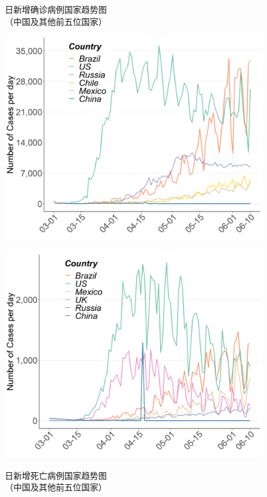 \documentclass[
]{article}
\begin{document}
\begin{figure}[H]
\centering
\begin{minipage}[b]{0.45\linewidth}
\caption{日新增确诊病例国家趋势图\\（中国及其他前五位国家）}
\includegraphics[]{./input/covid2.png}
\label{}
\end{minipage}
\quad
\begin{minipage}[b]{0.45\linewidth}
\caption{日新增死亡病例国家趋势图\\（中国及其他前五位国家） }
\includegraphics[]{./input/covid3.png}
\label{}
\end{minipage}
\end{figure}
\end{document}
